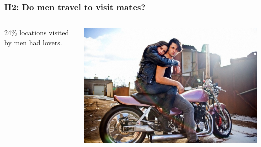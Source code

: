 \documentclass{beamer}
\begin{document}

\begin{frame}
\frametitle{H2: Do men travel to visit mates?}

\begin{columns}
\begin{column}{.6\textwidth}
24\% locations visited by men had lovers. \\
\vspace{0.75cm} 
\end{column}

\begin{column}{.4\textwidth}
\includegraphics[width=1\linewidth]{travelmate}
\end{column}

\end{columns}

\end{frame}

\end{document}
